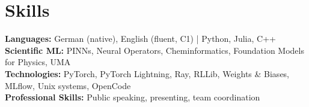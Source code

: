\documentclass[10pt, a4paper]{article}
\begin{document}
\section*{Skills}
\textbf{Languages:} German (native), English (fluent, C1) | Python, Julia, C++\\
\textbf{Scientific ML:} PINNs, Neural Operators, Cheminformatics, Foundation Models for Physics, UMA\\
\textbf{Technologies:} PyTorch, PyTorch Lightning, Ray, RLLib, Weights \& Biases, MLflow, Unix systems, OpenCode \\
\textbf{Professional Skills:} Public speaking, presenting, team coordination \\
\end{document}
